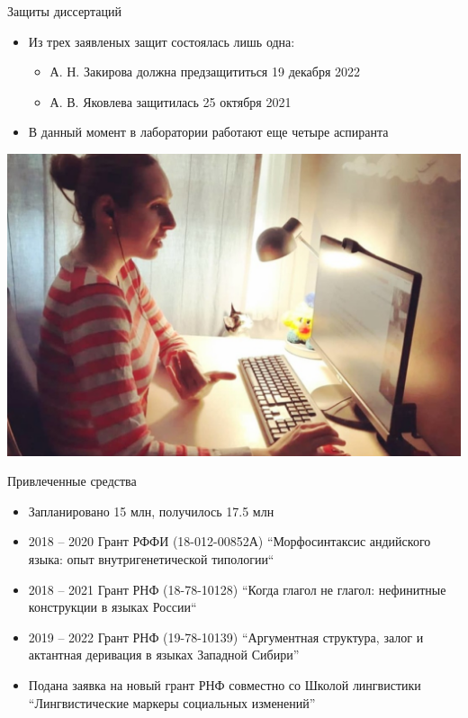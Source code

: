 \documentclass[
  13pt,
  ignorenonframetext,
]{beamer}
\providecommand{\tightlist}{%
  \setlength{\itemsep}{0pt}\setlength{\parskip}{0pt}}
\begin{document}
\begin{frame}{Защиты диссертаций}
\protect\hypertarget{ux437ux430ux449ux438ux442ux44b-ux434ux438ux441ux441ux435ux440ux442ux430ux446ux438ux439}{}
\begin{itemize}
\tightlist
\item
  Из трех заявленых защит состоялась лишь одна:

  \begin{itemize}
  \tightlist
  \item
    А. Н. Закирова должна предзащититься 19 декабря 2022
  \item
    А. В. Яковлева защитилась 25 октября 2021
  \end{itemize}
\item
  В данный момент в лаборатории работают еще четыре аспиранта
\end{itemize}

\begin{center}\includegraphics[width=0.8\linewidth]{images/07_yakovleva} \end{center}
\end{frame}

\begin{frame}{Привлеченные средства}
\protect\hypertarget{ux43fux440ux438ux432ux43bux435ux447ux435ux43dux43dux44bux435-ux441ux440ux435ux434ux441ux442ux432ux430}{}
\begin{itemize}
\tightlist
\item
  Запланировано 15 млн, получилось 17.5 млн
\item
  2018 -- 2020 Грант РФФИ (18-012-00852А) ``Морфосинтаксис андийского
  языка: опыт внутригенетической типологии``
\item
  2018 -- 2021 Грант РНФ (18-78-10128) ``Когда глагол не глагол:
  нефинитные конструкции в языках России``
\item
  2019 -- 2022 Грант РНФ (19-78-10139) ``Аргументная структура, залог и
  актантная деривация в языках Западной Сибири''
\item
  Подана заявка на новый грант РНФ совместно со Школой лингвистики
  ``Лингвистические маркеры социальных изменений''
\end{itemize}
\end{frame}
\end{document}

